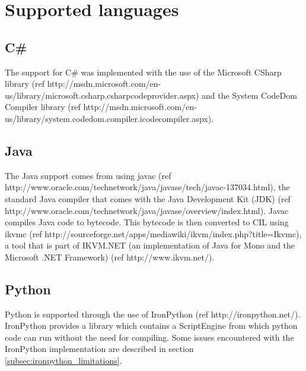 \section{Supported languages}

\subsection{C\#}
The support for C\# was implemented with the use of the Microsoft CSharp library (ref http://msdn.microsoft.com/en-us/library/microsoft.csharp.csharpcodeprovider.aspx) and the System CodeDom Compiler library (ref http://msdn.microsoft.com/en-us/library/system.codedom.compiler.icodecompiler.aspx).

\subsection{Java}
The Java support comes from using javac (ref http://www.oracle.com/technetwork/java/javase/tech/javac-137034.html), the standard Java compiler that comes with the Java Development Kit (JDK) (ref http://www.oracle.com/technetwork/java/javase/overview/index.html). Javac compiles Java code to bytecode. This bytecode is then converted to CIL using ikvmc (ref http://sourceforge.net/apps/mediawiki/ikvm/index.php?title=Ikvmc), a tool that is part of IKVM.NET (an implementation of Java for Mono and the Microsoft .NET Framework) (ref http://www.ikvm.net/). 

\subsection{Python}
Python is supported through the use of IronPython (ref http://ironpython.net/). IronPython provides a library which contains a ScriptEngine from which python code can run without the need for compiling. Some issues encountered with the IronPython implementation are described in section \ref{subsec:ironpython_limitations}.